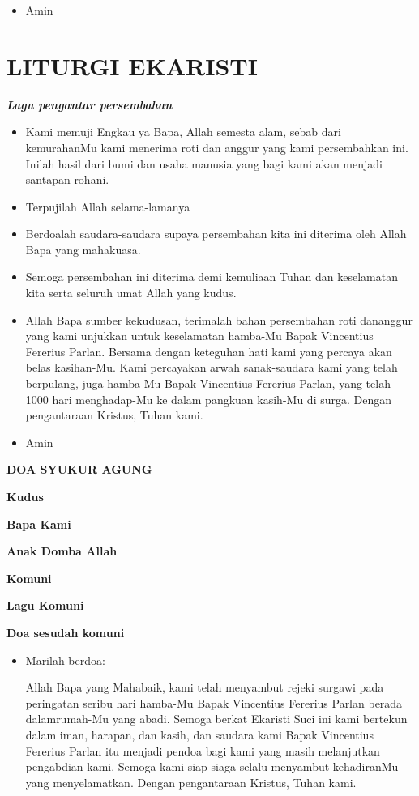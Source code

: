 \documentclass[titlepage,10pt,openany]{scrbook}
\makeatletter
\newcommand{\subjudul}[1]{%
  {\parindent \z@ 
    \interlinepenalty\@M \bfseries #1\par\nobreak \vskip 10\p@ }}
\newcommand{\lagu}[1]{%
  {\parindent \z@ 
    \interlinepenalty\@M \slshape \bfseries \normalsize \textit{#1}\par\nobreak \vskip 10\p@ }}
\newcommand{\BU}[1]{\begin{itemize} \item[U:] #1 \end{itemize}}
\newcommand{\BI}[1]{\begin{itemize} \item[I:] #1 \end{itemize}}
\newcommand{\namaalm}{Bapak Vincentius Fererius Parlan\xspace}
\makeatother
\begin{document}
\BU{Amin}

\section*{LITURGI EKARISTI}

\lagu{Lagu pengantar persembahan}


\BI{Kami memuji Engkau ya Bapa, Allah semesta alam, sebab 
dari kemurahanMu kami menerima roti dan anggur yang 
kami persembahkan ini. Inilah hasil dari bumi dan usaha 
manusia yang bagi kami akan menjadi santapan rohani.}

\BU{Terpujilah Allah selama-lamanya}

\BI{Berdoalah saudara-saudara supaya persembahan kita ini 
diterima oleh Allah Bapa yang mahakuasa.}

\BU{Semoga persembahan ini diterima demi kemuliaan Tuhan 
dan keselamatan kita serta seluruh umat Allah yang kudus.}

\BI{Allah Bapa sumber kekudusan, terimalah bahan persembahan roti dananggur yang kami unjukkan untuk keselamatan hamba-Mu \namaalm. Bersama dengan keteguhan hati kami yang percaya akan belas kasihan-Mu. Kami percayakan arwah sanak-saudara kami yang telah  berpulang,  juga   hamba-Mu  \namaalm,  yang  telah 1000 hari   menghadap-Mu   ke   dalam     pangkuan   kasih-Mu   di   surga. Dengan pengantaraan Kristus, Tuhan kami.}

\BU{Amin} 

\subjudul{DOA SYUKUR AGUNG}


\subjudul{Kudus}

\subjudul{Bapa Kami}

\subjudul{Anak Domba Allah}

\subjudul{Komuni}
\newpage
\subjudul{Lagu Komuni}
 
 

\subjudul{Doa sesudah komuni}

\BI{Marilah berdoa: 
	
	Allah Bapa yang Mahabaik, kami telah menyambut rejeki surgawi pada peringatan   seribu   hari   hamba-Mu  \namaalm   berada  dalamrumah-Mu yang abadi.  Semoga berkat Ekaristi Suci ini kami bertekun dalam iman, harapan, dan kasih, dan saudara kami \namaalm itu   menjadi   pendoa   bagi   kami   yang   masih   melanjutkan   pengabdian kami. Semoga  kami  siap  siaga  selalu  menyambut kehadiranMu  yang menyelamatkan. Dengan pengantaraan Kristus, Tuhan kami.}
\end{document}
